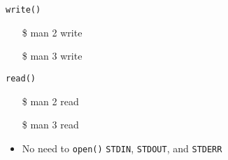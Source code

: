 \begin{frame}
  \begin{minipage}[t]{.53\linewidth}
    \begin{block}{\texttt{write()}}
      \begin{center}
      \end{center}
    \end{block}
    \ttfamily
    \begin{itemize}
    \item[\$] man 2 write
    \item[\$] man 3 write
    \end{itemize}
  \end{minipage}\qquad
  \begin{minipage}[t]{.37\linewidth}
    \begin{block}{\texttt{read()}}
      \begin{center}
      \end{center}
    \end{block}
    \ttfamily
    \begin{itemize}
    \item[\$] man 2 read
    \item[\$] man 3 read
    \end{itemize}
  \end{minipage}
  \vspace*{1em}
  \begin{itemize}
  \item No need to \texttt{open()} \texttt{STDIN}, \texttt{STDOUT}, and \texttt{STDERR}
  \end{itemize}
\end{frame}

\begin{frame}{}
  \begin{center}
    \begin{center}
    \end{center}
  \end{center}
\end{frame}

